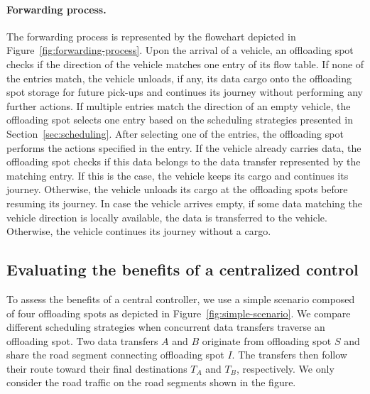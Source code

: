 \paragraph{Forwarding process.} 
The forwarding process is represented by the flowchart depicted in Figure~\ref{fig:forwarding-process}. Upon the arrival of a vehicle, an offloading spot checks if the direction of the vehicle matches one entry of its flow table. If none of the entries match, the vehicle unloads, if any, its data cargo onto the offloading spot storage for future pick-ups and continues its journey without performing any further actions. If multiple entries match the direction of an empty vehicle, the offloading spot selects one entry based on the scheduling strategies presented in Section~\ref{sec:scheduling}. After selecting one of the entries, the offloading spot performs the actions specified in the entry. If the vehicle already carries data, the offloading spot checks if this data belongs to the data transfer represented by the matching entry. If this is the case, the vehicle keeps its cargo and continues its journey. Otherwise, the vehicle unloads its cargo at the offloading spots before resuming its journey. In case the vehicle arrives empty, if some data matching the vehicle direction is locally available, the data is transferred to the vehicle. Otherwise, the vehicle continues its journey without a cargo. 

\subsection{Evaluating the benefits of a centralized control}
\label{sec:need-for-controller}

To assess the benefits of a central controller, we use a simple scenario composed of four offloading spots as depicted in Figure~\ref{fig:simple-scenario}. We compare different scheduling strategies when concurrent data transfers traverse an offloading spot. Two data transfers $A$ and $B$ originate from offloading spot $S$ and share the road segment connecting offloading spot $I$. The transfers then follow their route toward their final destinations $T_A$ and $T_B$, respectively. 
We only consider the road traffic on the road segments shown in the figure.


